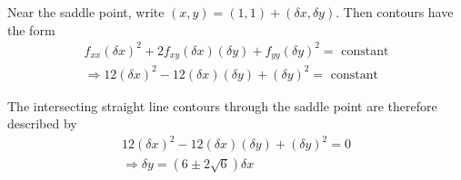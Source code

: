 \documentclass{article}
\begin{document}
\begin{eg}
    Near the saddle point, write $(x, y) = (1, 1) + (\delta x, \delta y)$.
    Then contours have the form
    \begin{align*}
        f_{xx}(\delta x)^2 + 2 f_{xy}(\delta x)(\delta y) + f_{yy}(\delta y)^2 = \text{ constant} \\
        \Rightarrow 12 (\delta x)^2 - 12 (\delta x)(\delta y) + (\delta y)^2 = \text{ constant} 
    \end{align*}

    The intersecting straight line contours through the saddle point are therefore described by
    \begin{align*}
        12 (\delta x)^2 - 12 (\delta x)(\delta y) + (\delta y)^2 = 0 \\
        \Rightarrow \delta y = (6 \pm 2 \sqrt{6}) \delta x
    \end{align*}
\end{eg}

\end{document}
